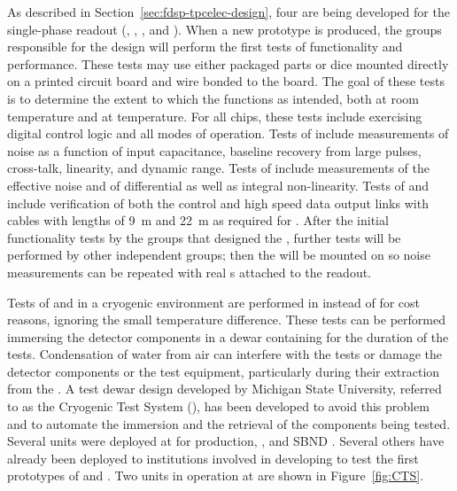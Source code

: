 As described in Section~\ref{sec:fdsp-tpcelec-design}, four  
are being developed for the   single-phase  readout 
(, , , and ). 
When a new prototype  is produced, the groups responsible for the  design will perform the first tests of 
 functionality and performance. These tests may use either 
packaged parts or dice mounted directly on a printed circuit board 
and wire bonded to the board.  The goal of these tests is to determine 
the extent to which the  functions as intended, both at room 
temperature and at \lntwo temperature.  For all chips, these tests 
include exercising digital control logic and all modes of operation. Tests 
of   include measurements of noise as a function 
of input capacitance, baseline recovery from large pulses, cross-talk, linearity, 
and dynamic range. Tests of  include measurements of the effective noise and 
of differential as well as integral non-linearity. Tests of  and  
include verification of both the control and high speed data output links with 
cables with lengths of \SI{9}{m} and \SI{22}{m} as required for  .
After the initial functionality
tests by the groups that designed the , further
tests will be performed by other independent groups; then the 
will be mounted on  so noise measurements can be repeated
with real s attached to the readout.

Tests of  and  in a cryogenic environment
are performed in \lntwo instead of  for cost reasons, ignoring
the small temperature difference. These tests can be performed immersing
the detector components in a dewar containing \lntwo for the duration
of the tests. Condensation of water from air can interfere with
the tests or damage the detector components or the test equipment,
particularly during their extraction from the \lntwo. A test dewar
design developed by Michigan State University, referred to as the
Cryogenic Test System (), has been developed to avoid
this problem and to automate the immersion and the retrieval of 
the components being tested. Several  units
were deployed at  for  production,  , and SBND  .
Several others have already been deployed to institutions involved in
developing  to test the first prototypes of 
and . Two  units in operation at  are 
shown in Figure~\ref{fig:CTS}.

